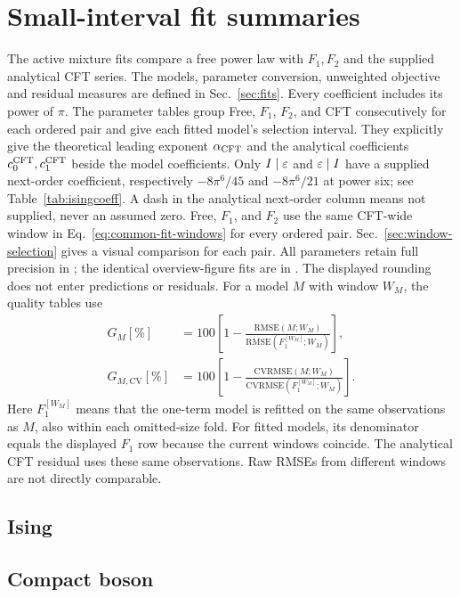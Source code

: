 \clearpage
\section{Small-interval fit summaries}
\label{sec:allfits}
The active mixture fits compare a free power law with $F_1,F_2$ and
the supplied analytical CFT series. The models, parameter conversion,
unweighted objective and residual measures are defined in
Sec.~\ref{sec:fits}. Every coefficient includes its power of $\pi$.
The parameter tables group Free, $F_1$, $F_2$, and CFT consecutively
for each ordered pair and give each fitted model's selection interval.
They explicitly give the theoretical leading exponent $\alpha_{\rm CFT}$ and the
analytical coefficients $c_0^{\rm CFT},c_1^{\rm CFT}$ beside the model
coefficients. Only $I\mid\varepsilon$ and $\varepsilon\mid I$ have a supplied
next-order coefficient, respectively $-8\pi^6/45$ and $-8\pi^6/21$
at power six; see Table~\ref{tab:isingcoeff}. A dash in the analytical
next-order column means not supplied, never an assumed zero.
Free, $F_1$, and $F_2$ use the same CFT-wide window in
Eq.~\eqref{eq:common-fit-windows} for every ordered pair.
Sec.~\ref{sec:window-selection} gives a visual comparison for each pair.
All parameters retain full precision in ;
the identical overview-figure fits are in .
The displayed rounding does not enter predictions or residuals.
For a model $M$ with window $W_M$, the quality tables use
\begin{align}
 G_M[\%]&=100\left[1-
 \frac{\mathrm{RMSE}(M;W_M)}{\mathrm{RMSE}(F_1^{[W_M]};W_M)}\right],\nonumber\\
 G_{M,\mathrm{CV}}[\%]&=100\left[1-
 \frac{\mathrm{CVRMSE}(M;W_M)}{\mathrm{CVRMSE}(F_1^{[W_M]};W_M)}\right].
 \label{eq:table-window-gains}
\end{align}
Here $F_1^{[W_M]}$ means that the one-term model is refitted on the
same observations as $M$, also within each omitted-size fold.
For fitted models, its denominator equals the displayed $F_1$ row
because the current windows coincide. The analytical CFT residual
uses these same observations. Raw RMSEs from different windows are
not directly comparable.
\subsection{Ising}
\label{sec:ising-fit-tables}
\begingroup\footnotesize\setlength{\tabcolsep}{3pt}


\endgroup
\subsection{Compact boson}
\label{sec:boson-fit-tables}
\begingroup\footnotesize\setlength{\tabcolsep}{3pt}


\endgroup


